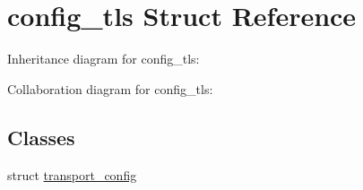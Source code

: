 \hypertarget{structconfig__tls}{}\section{config\+\_\+tls Struct Reference}
\label{structconfig__tls}


Inheritance diagram for config\+\_\+tls\+:


Collaboration diagram for config\+\_\+tls\+:
\subsection*{Classes}
\begin{DoxyCompactItemize}
\item 
struct \mbox{\hyperlink{structconfig__tls_1_1transport__config}{transport\+\_\+config}}
\end{DoxyCompactItemize}
